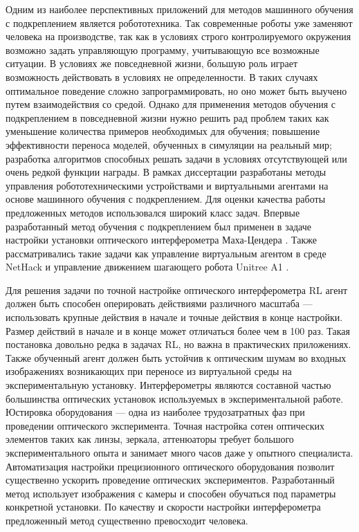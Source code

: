 {\actuality} Одним из наиболее перспективных приложений для методов машинного обучения с подкреплением является робототехника. Так современные роботы уже заменяют человека на производстве, так как в условиях строго контролируемого окружения возможно задать управляющую программу, учитывающую все возможные ситуации. В условиях же повседневной жизни, большую роль играет возможность действовать в условиях не определенности. В таких случаях оптимальное поведение сложно запрограммировать, но оно может быть выучено путем взаимодействия со средой. 
Однако для применения методов обучения с подкреплением в повседневной жизни нужно решить рад проблем таких как уменьшение количества примеров необходимых для обучения; повышение эффективности переноса моделей, обученных в симуляции на реальный мир; разработка алгоритмов способных решать задачи в условиях отсутствующей или очень редкой функции награды. В рамках диссертации разработаны методы управления робототехническими устройствами и виртуальными агентами на основе машинного обучения с подкреплением. Для оценки качества работы предложенных методов использовался широкий класс задач. Впервые разработанный метод обучения с подкреплением был применен в задаче настройки установки оптического интерферометра Маха-Цендера \cite{interferobot, v2}. Также рассматривались такие задачи как управление виртуальным агентом в среде NetHack \cite{nethack, raph} и управление движением шагающего робота Unitree A1 \cite{rl_unitree}. 

Для решения задачи по точной настройке оптического интерферометра RL агент должен быть способен оперировать действиями различного масштаба --- использовать крупные действия в начале и точные действия в конце настройки. Размер действий в начале и в конце может отличаться более чем в 100 раз. Такая постановка довольно редка в задачах RL, но важна в практических приложениях. Также обученный агент должен быть устойчив к оптическим шумам во входных изображениях возникающих при переносе из виртуальной среды на экспериментальную установку. Интерферометры являются составной частью большинства оптических установок используемых в экспериментальной работе. Юстировка оборудования --- одна из наиболее трудозатратных фаз при проведении оптического эксперимента. Точная настройка сотен оптических элементов таких как линзы, зеркала, аттенюаторы требует большого экспериментального опыта и занимает много часов даже у опытного специалиста. Автоматизация настройки прецизионного оптического оборудования позволит существенно ускорить проведение оптических экспериментов. Разработанный метод использует изображения с камеры и способен обучаться под параметры конкретной установки. По качеству и скорости настройки интерферометра предложенный метод существенно превосходит человека. 

